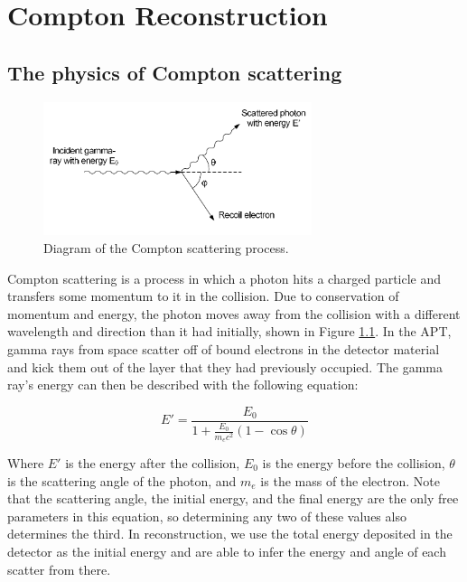 %
\chapter{Compton Reconstruction}

\section{The physics of Compton scattering}

\begin{figure}
    \centering
    \includegraphics[width=0.7\textwidth]{Compton_scatter.png}
    \caption{Diagram of the Compton scattering process. \cite{comptonThesis}}
    \label{fig:compton_scatter}
\end{figure}

Compton scattering is a process in which a photon hits a charged particle and transfers some momentum to it in the collision. Due to conservation of momentum and energy, the photon moves away from the collision with a different wavelength and direction than it had initially, shown in Figure \ref{fig:compton_scatter}. In the APT, gamma rays from space scatter off of bound electrons in the detector material and kick them out of the layer that they had previously occupied. The gamma ray's energy can then be described with the following equation:

\begin{equation}
    E' = \frac{E_0}{1+\frac{E_0}{m_ec^2}(1-\cos\theta)} \label{eq:compton}
\end{equation}

Where $E'$ is the energy after the collision, $E_0$ is the energy before the collision, $\theta$ is the scattering angle of the photon, and $m_e$ is the mass of the electron. Note that the scattering angle, the initial energy, and the final energy are the only free parameters in this equation, so determining any two of these values also determines the third. In reconstruction, we use the total energy deposited in the detector as the initial energy and are able to infer the energy and angle of each scatter from there.

